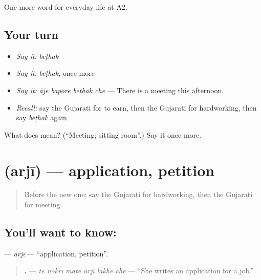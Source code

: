 \begin{grammarlens}[title={What you've built}]
One more word for everyday life at A2.
\end{grammarlens}

\subsection*{Your turn}
\begin{itemize}
\raggedright
  \item \emph{Say it:} \emph{beṭhak}
  \item \emph{Say it:} \emph{beṭhak}, once more
  \item \emph{Say it:} \emph{āje bapore beṭhak che} — There is a meeting this afternoon.
  \item \emph{Recall:} say the Gujarati for to earn, then the Gujarati for hardworking, then say \emph{beṭhak} again
\end{itemize}

\begin{tcolorbox}[breakable,colback=teal!4,colframe=teal!35!black,title={Before you move on}]
What does  mean? (\textquotedblleft{}Meeting; sitting room\textquotedblright{}.) Say it once more.
\end{tcolorbox}
\section[\texorpdfstring{\gu{અરજી} (arjī)}{અરજી (arjī)}]{ (arjī) — application, petition}

\label{lesson:GU-C248-arji}



\begin{quote}
Before the new one: say the Gujarati for hardworking, then the Gujarati for meeting.
\end{quote}

\subsection*{You'll want to know: }
\textbf{} — \emph{arjī} — \textquotedblleft{}application, petition\textquotedblright{}.

\begin{quote}
\textbf{     .} — \emph{te nokrī māṭe arjī lakhe che} — \textquotedblleft{}She writes an application for a job.\textquotedblright{}
\end{quote}

